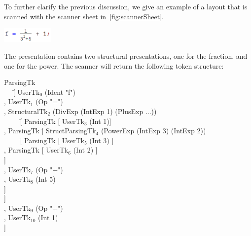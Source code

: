 \documentclass[12pt]{article}
\begin{document}
To further clarify the previous discussion, we give an example of a layout that is scanned with the scanner sheet in~\ref{fig:scannerSheet}.

\begin{center}
\includegraphics[width=1in]{images/scanFrac}\
\end{center}

The presentation contains two structural presentations, one for the fraction, and one for the power. The scanner will return the following token structure: 
\begin{tabbedCode}
ParsingTk \= \\
~~ \= [ UserTk$_0$ (Ident "f") \\
   \> , UserTk$_1$ (Op "=") \\
   \> , StructuralTk$_2$ (DivExp (IntExp 1) (PlusExp ...))\\
   \> ~~~~ \= [ ParsingTk [ UserTk$_3$ (Int 1)] \\
   \>      \> , ParsingTk  \= [ StructParsingTk$_4$ (PowerExp (IntExp 3) (IntExp 2))\\
   \>      \>              \> ~~~~ \= [ ParsingTk [ UserTk$_5$ (Int 3) ] \\
   \>      \>              \>      \> , ParsingTk [ UserTk$_6$ (Int 2) ] \\
   \>      \>              \>      \> ] \\
   \>      \>              \> , UserTk$_7$ (Op "+") \\
   \>      \>              \> , UserTk$_8$ (Int 5) \\
   \>      \>              \> ] \\
   \>      \> ] \\
   \> , UserTk$_9$ (Op "+") \\
   \> , UserTk$_{10}$ (Int 1) \\
   \> ] \\
\end{tabbedCode}

\end{document}

